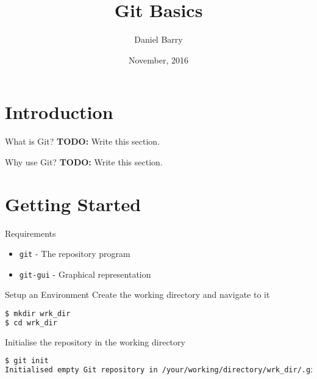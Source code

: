 \documentclass{beamer}
\title{Git Basics}
\date{November, 2016}
\author{Daniel Barry}
\institute{University of Hertfordshire}
\begin{document}
  \maketitle
  \section{Introduction}
  \begin{frame}{What is Git?}
    \textbf{TODO:} Write this section.
  \end{frame}
  \begin{frame}{Why use Git?}
    \textbf{TODO:} Write this section.
  \end{frame}
  \section{Getting Started}
  \begin{frame}{Requirements}
    \begin{itemize}
      \item \texttt{git} - The repository program
      \item \texttt{git-gui} - Graphical representation
    \end{itemize}
  \end{frame}
  \begin{frame}[fragile=singleslide]{Setup an Environment}
    Create the working directory and navigate to it
    \begin{lstlisting}[language=bash]
$ mkdir wrk_dir
$ cd wrk_dir
    \end{lstlisting}
    Initialise the repository in the working directory
    \begin{lstlisting}[language=bash]
$ git init
Initialised empty Git repository in /your/working/directory/wrk_dir/.git/
    \end{lstlisting}
  \end{frame}
\end{document}
